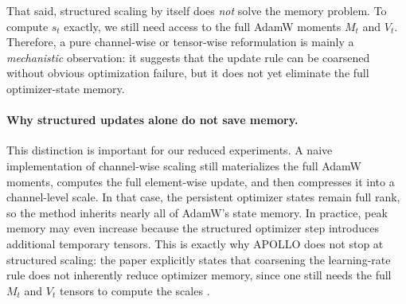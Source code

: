 \documentclass[10pt]{article}
\begin{document}
That said, structured scaling by itself does \emph{not} solve the memory problem. To compute $s_t$ exactly, we still need access to the full AdamW moments $M_t$ and $V_t$. Therefore, a pure channel-wise or tensor-wise reformulation is mainly a \emph{mechanistic} observation: it suggests that the update rule can be coarsened without obvious optimization failure, but it does not yet eliminate the full optimizer-state memory.

\paragraph{Why structured updates alone do not save memory.}
This distinction is important for our reduced experiments. A naive implementation of channel-wise scaling still materializes the full AdamW moments, computes the full element-wise update, and then compresses it into a channel-level scale. In that case, the persistent optimizer states remain full rank, so the method inherits nearly all of AdamW's state memory. In practice, peak memory may even increase because the structured optimizer step introduces additional temporary tensors. This is exactly why APOLLO does not stop at structured scaling: the paper explicitly states that coarsening the learning-rate rule does not inherently reduce optimizer memory, since one still needs the full $M_t$ and $V_t$ tensors to compute the scales \cite{apollo2025}.
\end{document}
